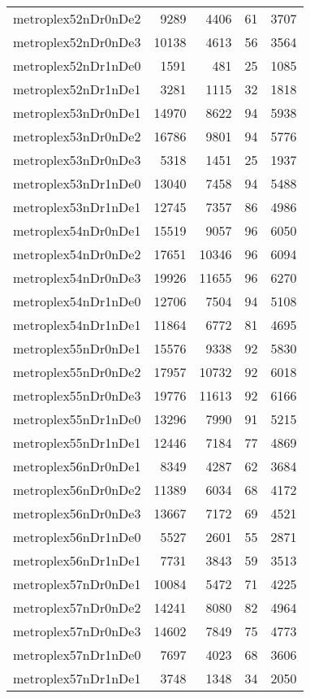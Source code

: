 \begin{longtable}{lrrrr}
metroplex52nDr0nDe2 & 9289 & 4406 & 61 & 3707 \\
metroplex52nDr0nDe3 & 10138 & 4613 & 56 & 3564 \\
metroplex52nDr1nDe0 & 1591 & 481 & 25 & 1085 \\
metroplex52nDr1nDe1 & 3281 & 1115 & 32 & 1818 \\
metroplex53nDr0nDe1 & 14970 & 8622 & 94 & 5938 \\
metroplex53nDr0nDe2 & 16786 & 9801 & 94 & 5776 \\
metroplex53nDr0nDe3 & 5318 & 1451 & 25 & 1937 \\
metroplex53nDr1nDe0 & 13040 & 7458 & 94 & 5488 \\
metroplex53nDr1nDe1 & 12745 & 7357 & 86 & 4986 \\
metroplex54nDr0nDe1 & 15519 & 9057 & 96 & 6050 \\
metroplex54nDr0nDe2 & 17651 & 10346 & 96 & 6094 \\
metroplex54nDr0nDe3 & 19926 & 11655 & 96 & 6270 \\
metroplex54nDr1nDe0 & 12706 & 7504 & 94 & 5108 \\
metroplex54nDr1nDe1 & 11864 & 6772 & 81 & 4695 \\
metroplex55nDr0nDe1 & 15576 & 9338 & 92 & 5830 \\
metroplex55nDr0nDe2 & 17957 & 10732 & 92 & 6018 \\
metroplex55nDr0nDe3 & 19776 & 11613 & 92 & 6166 \\
metroplex55nDr1nDe0 & 13296 & 7990 & 91 & 5215 \\
metroplex55nDr1nDe1 & 12446 & 7184 & 77 & 4869 \\
metroplex56nDr0nDe1 & 8349 & 4287 & 62 & 3684 \\
metroplex56nDr0nDe2 & 11389 & 6034 & 68 & 4172 \\
metroplex56nDr0nDe3 & 13667 & 7172 & 69 & 4521 \\
metroplex56nDr1nDe0 & 5527 & 2601 & 55 & 2871 \\
metroplex56nDr1nDe1 & 7731 & 3843 & 59 & 3513 \\
metroplex57nDr0nDe1 & 10084 & 5472 & 71 & 4225 \\
metroplex57nDr0nDe2 & 14241 & 8080 & 82 & 4964 \\
metroplex57nDr0nDe3 & 14602 & 7849 & 75 & 4773 \\
metroplex57nDr1nDe0 & 7697 & 4023 & 68 & 3606 \\
metroplex57nDr1nDe1 & 3748 & 1348 & 34 & 2050 \\

\end{longtable}

